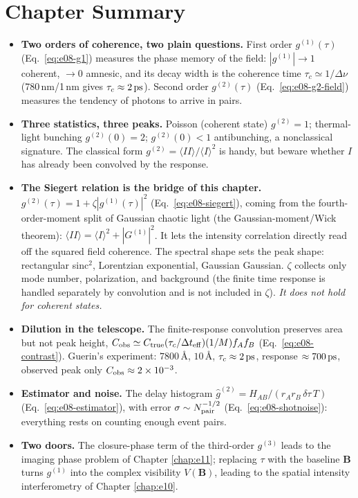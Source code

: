 \section{Chapter Summary}
\label{sec:e08-summary}

\begin{itemize}
  \item \textbf{Two orders of coherence, two plain questions.} First order \(g^{(1)}(\tau)\) (Eq.~\eqref{eq:e08-g1}) measures the phase memory of the field: \(|g^{(1)}|\to1\) coherent, \(\to0\) amnesic, and its decay width is the coherence time \(\tau_c\simeq1/\Delta\nu\) (780\,nm/1\,nm gives \(\tau_c\approx2\,{\rm ps}\)). Second order \(g^{(2)}(\tau)\) (Eq.~\eqref{eq:e08-g2-field}) measures the tendency of photons to arrive in pairs.
  \item \textbf{Three statistics, three peaks.} Poisson (coherent state) \(g^{(2)}=1\); thermal-light bunching \(g^{(2)}(0)=2\); \(g^{(2)}(0)<1\) antibunching, a nonclassical signature. The classical form \(g^{(2)}=\langle II\rangle/\langle I\rangle^2\) is handy, but beware whether \(I\) has already been convolved by the response.
  \item \textbf{The Siegert relation is the bridge of this chapter.} \(g^{(2)}(\tau)=1+\zeta|g^{(1)}(\tau)|^2\) (Eq.~\eqref{eq:e08-siegert}), coming from the fourth-order-moment split of Gaussian chaotic light (the Gaussian-moment/Wick theorem): \(\langle II\rangle=\langle I\rangle^2+|G^{(1)}|^2\). It lets the intensity correlation directly read off the squared field coherence. The spectral shape sets the peak shape: rectangular sinc\(^2\), Lorentzian exponential, Gaussian Gaussian. \(\zeta\) collects only mode number, polarization, and background (the finite time response is handled separately by convolution and is not included in \(\zeta\)). \emph{It does not hold for coherent states.}
  \item \textbf{Dilution in the telescope.} The finite-response convolution preserves area but not peak height, \(C_{\rm obs}\simeq C_{\rm true}(\tau_c/\Delta t_{\rm eff})(1/M)f_Af_B\) (Eq.~\eqref{eq:e08-contrast}). Guerin's experiment: \(7800\,\text{\AA}\), \(10\,\text{\AA}\), \(\tau_c\approx2\,{\rm ps}\), response \(\approx700\,{\rm ps}\), observed peak only \(C_{\rm obs}\approx2\times10^{-3}\).
  \item \textbf{Estimator and noise.} The delay histogram \(\widehat g^{(2)}=H_{AB}/(r_Ar_B\,\delta\tau\,T)\) (Eq.~\eqref{eq:e08-estimator}), with error \(\sigma\sim N_{\rm pair}^{-1/2}\) (Eq.~\eqref{eq:e08-shotnoise}): everything rests on counting enough event pairs.
  \item \textbf{Two doors.} The closure-phase term of the third-order \(g^{(3)}\) leads to the imaging phase problem of Chapter \ref{chap:e11}; replacing \(\tau\) with the baseline \(\bm B\) turns \(g^{(1)}\) into the complex visibility \(V(\bm B)\), leading to the spatial intensity interferometry of Chapter \ref{chap:e10}.
\end{itemize}


